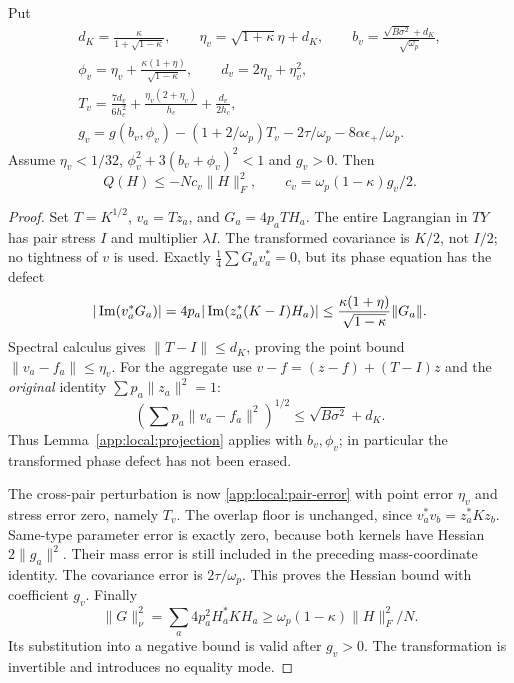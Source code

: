\begin{lemma}\label{app:local:stress-mean}
Put
\begin{gather*}
 d_K=\frac{\kappa}{1+\sqrt{1-\kappa}},\qquad
 \eta_v=\sqrt{1+\kappa}\eta+d_K,\qquad
 b_v=\frac{\sqrt{B\sigma^2}+d_K}{\sqrt{\omega_p}},\\
 \phi_v=\eta_v+\frac{\kappa(1+\eta)}{\sqrt{1-\kappa}},\qquad
 d_v=2\eta_v+\eta_v^2,\\
 T_v=\frac{7d_v}{6h_c^2}
               +\frac{\eta_v(2+\eta_v)}{h_c}+\frac{d_v}{2h_c},\\
 g_v=g(b_v,\phi_v)-(1+2/\omega_p)T_v-2\tau/\omega_p-8\alpha\epsilon_+/\omega_p .
\end{gather*}
Assume $\eta_v<1/32$, $\phi_v^2+3(b_v+\phi_v)^2<1$ and $g_v>0$.
Then
\begin{equation}\label{app:local:stress-gap}
 Q(H)\le-Nc_v\|H\|_F^2,\qquad c_v=\omega_p(1-\kappa)g_v/2 .
\end{equation}
\end{lemma}
\begin{proof}
Set $T=K^{1/2}$, $v_a=Tz_a$, and $G_a=4p_aTH_a$.
The entire Lagrangian in $TY$ has pair stress $I$ and multiplier
$\lambda I$. The transformed covariance is $K/2$, not $I/2$;
no tightness of $v$ is used.
Exactly $\frac14\sum G_av_a^*=0$, but its phase equation has the defect
\[
 |\operatorname{Im}(v_a^*G_a)|
 =4p_a|\operatorname{Im}(z_a^*(K-I)H_a)|
 \le\frac{\kappa(1+\eta)}{\sqrt{1-\kappa}}\|G_a\|.
\]
Spectral calculus gives $\|T-I\|\le d_K$, proving the point bound
$\|v_a-f_a\|\le\eta_v$. For the aggregate use
$v-f=(z-f)+(T-I)z$ and the \emph{original} identity
$\sum p_a\|z_a\|^2=1$:
\[
 \left(\sum p_a\|v_a-f_a\|^2\right)^{1/2}
                         \le\sqrt{B\sigma^2}+d_K .
\]
Thus Lemma~\ref{app:local:projection} applies with $b_v,\phi_v$;
in particular the transformed phase defect has not been erased.

The cross-pair perturbation is now
\eqref{app:local:pair-error} with point error $\eta_v$ and stress
error zero, namely $T_v$. The overlap floor is unchanged, since
$v_a^*v_b=z_a^*Kz_b$.
Same-type parameter error is exactly zero, because both kernels have
Hessian $2\|g_a\|^2$. Their mass error is still included in the preceding
mass-coordinate identity. The covariance error is $2\tau/\omega_p$.
This proves the Hessian bound with coefficient $g_v$.
Finally
\[
 \|G\|_\nu^2=\sum_a4p_a^2H_a^*KH_a
             \ge \omega_p(1-\kappa)\|H\|_F^2/N .
\]
Its substitution into a negative bound is valid after $g_v>0$.
The transformation is invertible and introduces no equality mode.
\end{proof}

